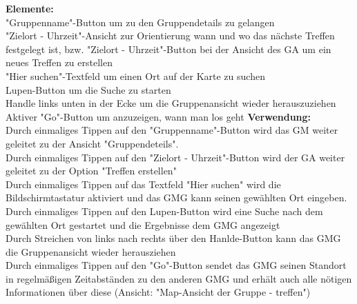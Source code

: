 \textbf{Elemente:}\\
"Gruppenname"-Button um zu den Gruppendetails zu gelangen\\
"Zielort - Uhrzeit"-Ansicht zur Orientierung wann und wo das nächste Treffen festgelegt ist, bzw. "Zielort - Uhrzeit"-Button bei der Ansicht des GA um ein neues Treffen zu erstellen\\
"Hier suchen"-Textfeld um einen Ort auf der Karte zu suchen\\
Lupen-Button um die Suche zu starten\\
Handle links unten in der Ecke um die Gruppenansicht wieder herauszuziehen\\
Aktiver "Go"-Button um anzuzeigen, wann man los geht
\textbf{Verwendung:}\\
Durch einmaliges Tippen auf den "Gruppenname"-Button wird das GM weiter geleitet zu der Ansicht "Gruppendeteils".\\
Durch einmaliges Tippen auf den "Zielort - Uhrzeit"-Button wird der GA weiter geleitet zu der Option "Treffen erstellen"\\
Durch einmaliges Tippen auf das Textfeld "Hier suchen" wird die Bildschirmtastatur aktiviert und das GMG kann seinen gewählten Ort eingeben.\\
Durch einmaliges Tippen auf den Lupen-Button wird eine Suche nach dem gewählten Ort gestartet und die Ergebnisse dem GMG angezeigt\\
Durch Streichen von links nach rechts über den Hanlde-Button kann das GMG die Gruppenansicht wieder herausziehen\\
Durch einmaliges Tippen auf den "Go"-Button sendet das GMG seinen Standort in regelmäßigen Zeitabständen zu den anderen GMG und erhält auch alle nötigen Informationen über diese (Ansicht: "Map-Ansicht der Gruppe - treffen")\\ \\

